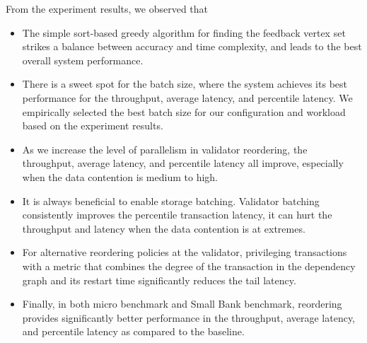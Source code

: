 From the experiment results, we observed that 
\vspace{-.5em}
\begin{itemize}
\item The simple sort-based greedy algorithm for finding the feedback vertex set strikes a balance between accuracy and time complexity, and leads to the best overall system performance. 
\vspace{-.5em}
\item There is a sweet spot for the batch size, where the system achieves its best performance for the throughput, average latency, and percentile latency. We empirically selected the best batch size for our configuration and workload based on the experiment results.
\vspace{-.5em}
\item As we increase the level of parallelism in validator reordering, the throughput, average latency, and percentile latency all improve, especially when the data contention is medium to high.
\vspace{-.5em}
\item It is always beneficial to enable storage batching. Validator batching consistently improves the percentile transaction latency, it can hurt the throughput and latency when the data contention is at extremes.
\vspace{-.5em}
\item For alternative reordering policies at the validator, privileging transactions with a metric that combines the degree of the transaction in the dependency graph and its restart time significantly reduces the tail latency.
\vspace{-.5em}
\item Finally, in both micro benchmark and Small Bank benchmark, reordering provides significantly better performance in the throughput, average latency, and percentile latency as compared to the baseline. 
\vspace{-.5em}
\end{itemize}  